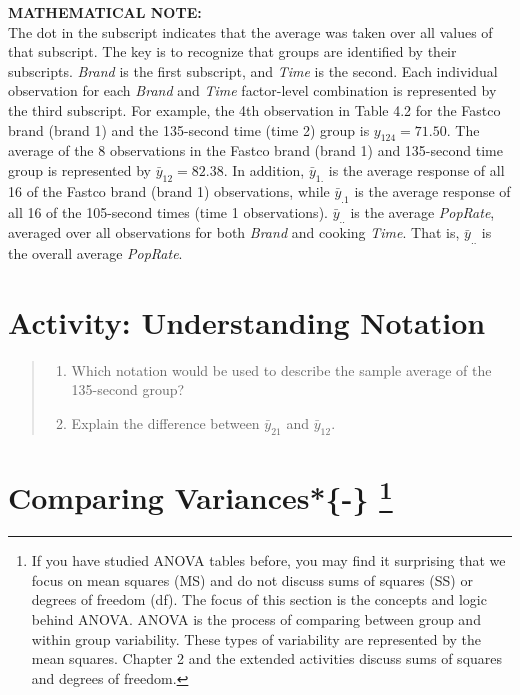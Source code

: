 \documentclass[
]{report}
\providecommand{\tightlist}{%
  \setlength{\itemsep}{0pt}\setlength{\parskip}{0pt}}
\begin{document}
\large

\textbf{MATHEMATICAL NOTE:}\\
The dot in the subscript indicates that the average was taken over all values of that subscript. The key is to recognize that groups are identified by their subscripts. \emph{Brand} is the first subscript, and \emph{Time} is the second. Each individual observation for each \emph{Brand} and \emph{Time} factor-level combination is represented by the third subscript. For example, the 4th observation in Table 4.2 for the Fastco brand (brand 1) and the 135-second time (time 2) group is \(y_{124} = 71.50\). The average of the 8 observations in the Fastco brand (brand 1) and 135-second time group is represented by \(\bar{y}_{12} = 82.38\). In addition, \(\bar{y}_{1.}\) is the average response of all 16 of the Fastco brand (brand 1) observations, while \(\bar{y}_{.1}\) is the average response of all 16 of the 105-second times (time 1 observations). \(\bar{y}_{..}\) is the average \emph{PopRate}, averaged over all observations for both \emph{Brand} and cooking \emph{Time}. That is, \(\bar{y}_{..}\) is the overall average \emph{PopRate}.
\normalsize

\hypertarget{activity-understanding-notation}{%
\section*{Activity: Understanding Notation}\label{activity-understanding-notation}}

\begin{quote}
\begin{enumerate}
\def\labelenumi{\arabic{enumi}.}
\setcounter{enumi}{5}
\tightlist
\item
  Which notation would be used to describe the sample average of the 135-second group?\\
\item
  Explain the difference between \(\bar{y}_{21}\) and \(\bar{y}_{12}\).
\end{enumerate}
\end{quote}

\hypertarget{comparing-variances-}{%
\section[Comparing Variances*\{-\} ]{\texorpdfstring{Comparing Variances*\{-\} \footnote{If you have studied ANOVA tables before, you may find it surprising that we focus on mean squares (MS) and do not discuss sums of squares (SS) or degrees of freedom (df). The focus of this section is the concepts and logic behind ANOVA. ANOVA is the process of comparing between group and within group variability. These types of variability are represented by the mean squares. Chapter 2 and the extended activities discuss sums of squares and degrees of freedom.}}{Comparing Variances*\{-\} }}\label{comparing-variances-}}
\end{document}
